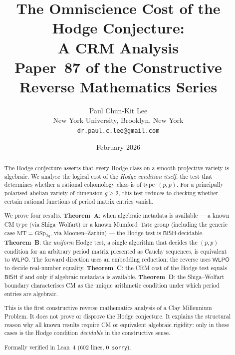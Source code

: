 \documentclass[11pt]{article}
\theoremstyle{plain}
\theoremstyle{definition}
\theoremstyle{remark}
\newcommand{\MT}{\mathrm{MT}}
\newcommand{\BISH}{\ensuremath{\mathsf{BISH}}}
\newcommand{\WLPO}{\ensuremath{\mathsf{WLPO}}}
\begin{document}
\title{The Omniscience Cost of the Hodge Conjecture:\\
A CRM Analysis\\[6pt]
\large Paper~87 of the Constructive Reverse Mathematics Series}

\author{Paul Chun-Kit Lee\\
\small New York University, Brooklyn, New York\\
\small \texttt{dr.paul.c.lee@gmail.com}}

\date{February 2026}

\maketitle

\begin{abstract}
The Hodge conjecture asserts that every Hodge class on a smooth projective variety is algebraic. We analyse the logical cost of the \emph{Hodge condition itself}: the test that determines whether a rational cohomology class is of type~$(p,p)$. For a principally polarised abelian variety of dimension $g \geq 2$, this test reduces to checking whether certain rational functions of period matrix entries vanish.

We prove four results. \textbf{Theorem~A}: when algebraic metadata is available --- a known CM type (via Shiga--Wolfart) or a known Mumford--Tate group (including the generic case $\MT = \mathrm{GSp}_{2g}$, via Moonen--Zarhin) --- the Hodge test is $\BISH$-decidable. \textbf{Theorem~B}: the \emph{uniform} Hodge test, a single algorithm that decides the $(p,p)$ condition for an arbitrary period matrix presented as Cauchy sequences, is equivalent to $\WLPO$. The forward direction uses an embedding reduction; the reverse uses $\WLPO$ to decide real-number equality. \textbf{Theorem~C}: the CRM cost of the Hodge test equals $\BISH$ if and only if algebraic metadata is available. \textbf{Theorem~D}: the Shiga--Wolfart boundary characterises CM as the unique arithmetic condition under which period entries are algebraic.

This is the first constructive reverse mathematics analysis of a Clay Millennium Problem. It does not prove or disprove the Hodge conjecture. It explains the structural reason why all known results require CM or equivalent algebraic rigidity: only in these cases is the Hodge condition \emph{decidable} in the constructive sense.

Formally verified in Lean~4 (602 lines, 0~\texttt{sorry}).
\end{abstract}
\end{document}
